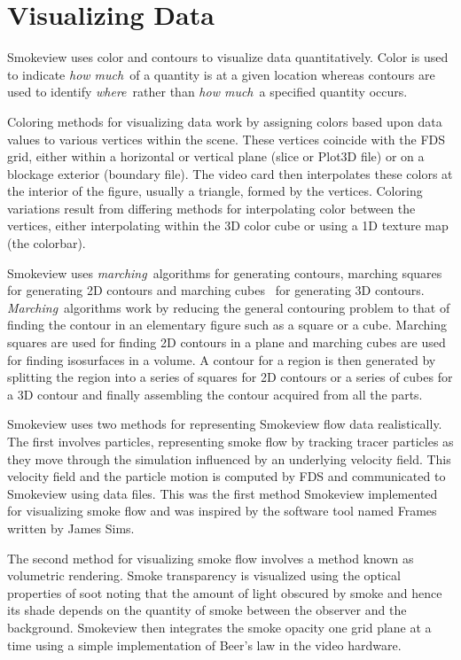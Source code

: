 \documentclass[11pt,twoside]{book}
\begin{document}
%
%

\chapter{Visualizing Data}
Smokeview uses color and contours to visualize data
quantitatively. Color is used to indicate {\em how much}\ of a
quantity is at a given location whereas contours are used to
identify {\em where}\ rather than {\em how much}\ a specified
quantity occurs.

Coloring methods for visualizing data work by assigning colors
based upon data values to various vertices within the scene. These
vertices coincide with the FDS grid, either within a horizontal or
vertical plane (slice or Plot3D file) or on a blockage exterior
(boundary file).  The video card then interpolates these colors at
the interior of the figure, usually a triangle, formed by the
vertices. Coloring variations result from differing methods for
interpolating color between the vertices, either interpolating
within the 3D color cube or using a 1D texture map (the colorbar).

Smokeview uses {\em marching}\ algorithms for generating contours,
marching squares for generating 2D contours and marching
cubes~\cite{marchingcubes} for generating 3D contours. {\em
Marching}\ algorithms work by reducing the general contouring
problem to that of finding the contour in an elementary figure
such as a square or a cube.  Marching squares are used for finding
2D contours in a plane and marching cubes are used for finding
isosurfaces in a volume. A contour for a region is then generated
by splitting the region into a series of squares for 2D contours
or a series of cubes for a 3D contour and finally assembling the
contour acquired from all the parts.

Smokeview uses two methods for representing Smokeview flow data
realistically.  The first involves particles, representing smoke
flow by tracking tracer particles as they move through the
simulation influenced by an underlying  velocity field.  This
velocity field and the particle motion is computed by FDS and
communicated to Smokeview using data files.  This was the first
method Smokeview implemented for visualizing smoke flow and was
inspired by the software tool named Frames written by James Sims.

The second method for visualizing smoke flow involves a method
known as volumetric rendering.  Smoke transparency is visualized
using the optical properties of soot noting that the amount
of light obscured by smoke and hence its shade depends on
the quantity of smoke between the observer and the background.
Smokeview then integrates the smoke opacity one grid plane at a
time using a simple implementation of Beer's law in the video
hardware.
\end{document}
